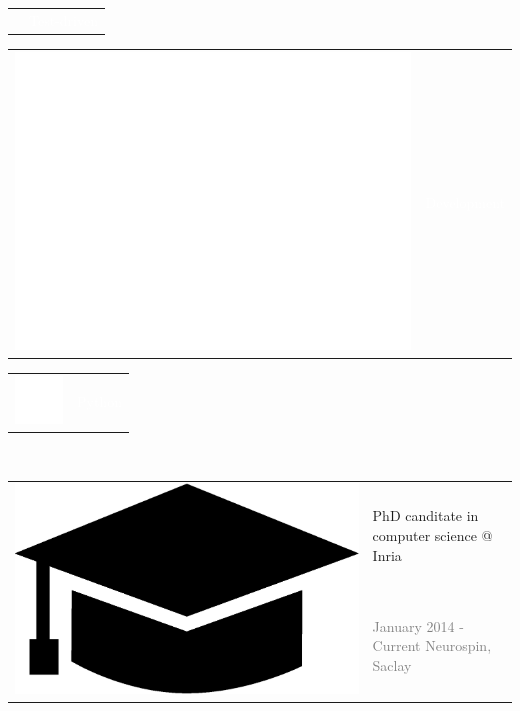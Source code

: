 \documentclass[letterpaper]{article}
\begin{document}
\begin{minipage}{1.\linewidth}
{\begin{minipage}{0.47\linewidth}
\begin{minipage}{1\linewidth}
\begin{minipage}{0.47\linewidth}
\begin{minipage}{1\linewidth}
{\begin{tabularx}{1\textwidth}{rX}
				 	& \textcolor{white}{Test-driven}\\				 	
				\end{tabularx}
				}
			\end{minipage}
		\end{minipage}		
		\hfill
		\begin{minipage}{0.47\linewidth}
			\begin{tabularx}{1\textwidth}{rX}
				\includegraphics[width=0.1\linewidth]{code.eps} & 
				\large\textmd{\textcolor{white}{Development}}\\
			\end{tabularx}
			\vspace{1ex}
			\begin{tabularx}{1\textwidth}{rX}
				\includegraphics[trim=0.18cm 0.18cm 0.18cm 0.18cm, clip=true, 
				width=0.08\linewidth]{python-48.png} & 
				\small\textcolor{white}{Python}
			\end{tabularx}
		\end{minipage}\\ 
	\end{minipage} %
%
\end{minipage} %
}%
% 
%
%
\hfill
\begin{minipage}{0.47\linewidth}
	\begin{minipage}{1\linewidth}
	\end{minipage}
	\begin{minipage}{1\linewidth} %
		\vspace{2ex}
		\begin{tabularx}{1\textwidth}{rX}				
			\multirow{2}{*}{\includegraphics[trim= 0.1cm 0.1cm 0.1cm 0.1cm,	
			clip=true, width=0.12\linewidth]{hat.eps}} & {\large PhD canditate 
			in computer science @ Inria}\\
			& {\small\textcolor{gray}{January 2014 - Current \hfill Neurospin, 
			Saclay}}\\
		\end{tabularx}
		\vspace{0.1cm}
		

\end{minipage}
\end{minipage}
\end{minipage}
\end{document}

